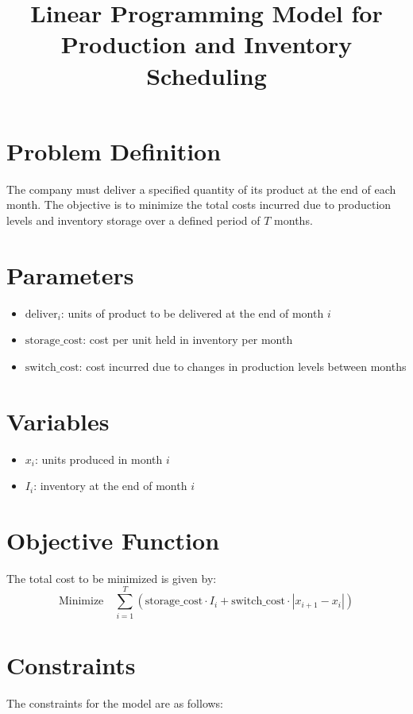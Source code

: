 \documentclass{article}
\begin{document}
\title{Linear Programming Model for Production and Inventory Scheduling}
\author{}
\date{}
\maketitle

\section*{Problem Definition}
The company must deliver a specified quantity of its product at the end of each month. The objective is to minimize the total costs incurred due to production levels and inventory storage over a defined period of \( T \) months. 

\section*{Parameters}
\begin{itemize}
    \item \( \text{deliver}_i \): units of product to be delivered at the end of month \( i \)
    \item \( \text{storage\_cost} \): cost per unit held in inventory per month
    \item \( \text{switch\_cost} \): cost incurred due to changes in production levels between months
\end{itemize}

\section*{Variables}
\begin{itemize}
    \item \( x_i \): units produced in month \( i \)
    \item \( I_i \): inventory at the end of month \( i \)
\end{itemize}

\section*{Objective Function}
The total cost to be minimized is given by:
\[
\text{Minimize} \quad \sum_{i=1}^{T} \left( \text{storage\_cost} \cdot I_i + \text{switch\_cost} \cdot |x_{i+1} - x_i| \right)
\]

\section*{Constraints}
The constraints for the model are as follows:
\end{document}
